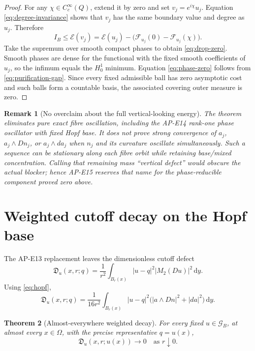 \documentclass[11pt]{article}
\newtheorem{theorem}{Theorem}[section]
\newtheorem{remark}[theorem]{Remark}
\newcommand{\dd}{\,\mathrm d}
\newcommand{\cE}{\mathcal E}
\newcommand{\cG}{\mathcal G}
\begin{document}
\begin{proof}
For any $\chi\in C^\infty_c(Q)$, extend it by zero and set
$v_j=e^{i\chi}u_j$.  Equation \eqref{eq:degree-invariance} shows that $v_j$
has the same boundary value and degree as $u_j$.  Therefore
\[
 I_B\leq\cE(v_j)
 =\cE(u_j)-\bigl(\mathcal F_{u_j}(0)-\mathcal F_{u_j}(\chi)\bigr).
\]
Take the supremum over smooth compact phases to obtain
\eqref{eq:drop-zero}.  Smooth phases are dense for the functional with the
fixed smooth coefficients of $u_j$, so the infimum equals the $H^1_0$
minimum.  Equation \eqref{eq:phase-zero} follows from
\eqref{eq:purification-gap}.  Since every fixed admissible ball has zero
asymptotic cost and such balls form a countable basis, the associated
covering outer measure is zero.
\end{proof}

\begin{remark}[No overclaim about the full vertical-looking energy]
The theorem eliminates pure exact fibre oscillation, including the AP-E14
rank-one phase oscillator with fixed Hopf base.  It does \emph{not} prove
strong convergence of $a_j$, $a_j\wedge Dn_j$, or $a_j\wedge da_j$ when
$n_j$ and its curvature oscillate simultaneously.  Such a sequence can be
stationary along each fibre orbit while retaining base/mixed concentration.
Calling that remaining mass ``vertical defect'' would obscure the actual
blocker; hence AP-E15 reserves that name for the phase-reducible component
proved zero above.
\end{remark}

\section{Weighted cutoff decay on the Hopf base}

The AP-E13 replacement leaves the dimensionless cutoff defect
\begin{equation}
 \mathfrak D_u(x,r;q)=
 \frac1{r^2}\int_{B_r(x)}|u-q|^2|M_2(Du)|^2\dd y.
 \label{eq:weighted-defect}
\end{equation}
Using \eqref{eq:hopf},
\begin{equation}
 \mathfrak D_u(x,r;q)=\frac1{16r^2}\int_{B_r(x)}
 |u-q|^2\bigl(|a\wedge Dn|^2+|da|^2\bigr)\dd y.
 \label{eq:weighted-hopf}
\end{equation}

\begin{theorem}[Almost-everywhere weighted decay]
For every fixed $u\in\cG_B$, at almost every $x\in\Omega$, with the precise
representative $q=u(x)$,
\begin{equation}
 \boxed{\qquad
 \mathfrak D_u(x,r;u(x))\longrightarrow0
 \quad\text{as }r\downarrow0.\qquad}
 \label{eq:ae-decay}
\end{equation}
\end{theorem}
\end{document}
